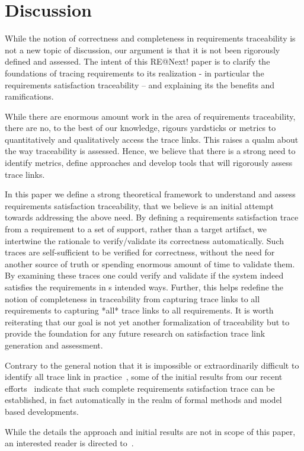 \section{Discussion}

While the notion of correctness and completeness in requirements traceability is not a new topic of discussion, our argument is that it is not been rigorously defined and assessed. The intent of this RE@Next! paper is to clarify the foundations of tracing requirements to its realization - in particular the requirements satisfaction traceability -- and explaining its the benefits and ramifications.

While there are enormous amount work in the area of requirements traceability, there are no, to the best of our knowledge, rigours yardsticks or metrics to quantitatively and qualitatively access the trace links. This raises a qualm about the way traceability is assessed. Hence, we believe that there is a strong need to identify metrics, define approaches and develop tools that will rigorously assess trace links.

In this paper we define a strong theoretical framework to understand and assess requirements satisfaction traceability, that we believe is an initial attempt towards addressing the above need. By defining a requirements satisfaction trace from a requirement to a set of support, rather than a target artifact, we intertwine the rationale to verify/validate its correctness automatically. Such traces are self-sufficient to be verified for correctness, without the need for another source of truth or spending enormous amount of time to validate them. By examining these traces one could verify and validate if the system indeed satisfies the requirements in s intended ways. Further, this helps redefine the notion of completeness in traceability from capturing trace links to all requirements to capturing *all* trace links to all requirements. It is worth reiterating that our goal is not yet another formalization of traceability but to provide the foundation for any future research on satisfaction trace link generation and assessment.

Contrary to the general notion that it is impossible or extraordinarily difficult to identify all trace link in practice~\cite{stravsunskas2002traceability}, some of the initial results from our recent efforts~\cite{2016arXiv160304276G} indicate that such complete requirements satisfaction trace can be established, in fact automatically in the realm of formal methods and model based developments. 



While the details the approach and initial results are not in scope of this paper, an interested reader is directed to~\cite{2016arXiv160304276G}.

